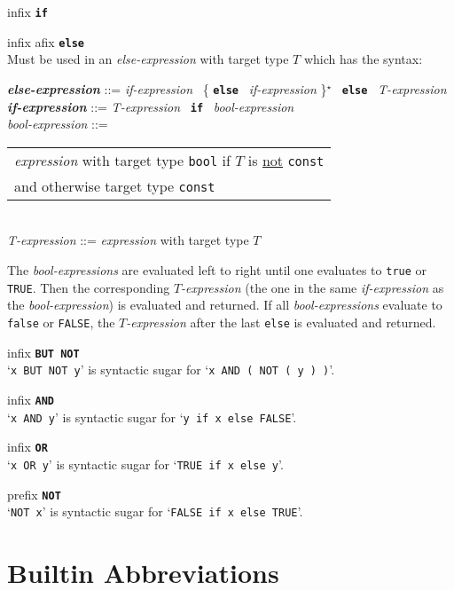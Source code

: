 \documentclass[12pt]{article}
\newcommand{\TT}[1]{{\tt \bfseries #1}}
\newcommand{\STAR}{{\Large $^\star$}}
\newcommand{\ttkey}[1]{{\tt \bfseries #1}}
\newcommand{\emkey}[1]{{\em \bfseries #1}}
\newenvironment{indpar}[1][0.3in]%
	{\begin{list}{}%
		     {\setlength{\itemsep}{0in}%
		      \setlength{\topsep}{0in}%
		      \setlength{\parsep}{1ex}%
		      \setlength{\labelwidth}{#1}%
		      \setlength{\leftmargin}{#1}%
		      \addtolength{\leftmargin}{\labelsep}}%
	 \item}%
	{\end{list}}
\newenvironment{itemlist}[1][1.2in]%
	{\begin{list}{}{\setlength{\labelwidth}{#1}%
		        \setlength{\leftmargin}{\labelwidth}%
		        \addtolength{\leftmargin}{+0.2in}%
		        \renewcommand{\makelabel}[1]{##1\hfill}}}%
	{\end{list}}
\begin{document}
\begin{itemlist}[0.2in]
\item[infix \TT{if}]
\item[infix afix \TT{else}] \vspace*{-0.15in} ~\\
Must be used in an {\em else-expression} with target
type $T$ which has the syntax:
\begin{indpar}[0.2in]
\emkey{else-expression} ::=
    {\em if-expression}~ \{ \ttkey{else}~ {\em if-expression} \}\STAR{}~
    \ttkey{else}~ {\em T-expression}
\\[0.5ex]
\emkey{if-expression} ::=
    {\em T-expression}~ \ttkey{if}~ {\em bool-expression}
\\[0.5ex]
{\em bool-expression} ::=
    \begin{tabular}[t]{@{}l@{}}
    {\em expression} with target type {\tt bool}
	if $T$ is \underline{not} {\tt const} \\
    and otherwise target type {\tt const}
    \end{tabular}
\\[0.5ex]
{\em T-expression} ::= {\em expression} with target type $T$
\end{indpar}
The {\em bool-expressions} are evaluated left to right until one
evaluates to {\tt true} or {\tt TRUE}.
Then the corresponding {\em $T$-expression}
(the one in the same {\em if-expression} as the {\em bool-expression})
is evaluated and returned.  If all {\em bool-expressions} evaluate to
{\tt false} or {\tt FALSE}, the {\em $T$-expression} after the last {\tt else}
is evaluated and returned.

\item[infix \TT{BUT NOT}] ~\\
`{\tt x BUT NOT y}' is syntactic sugar for `{\tt x AND ( NOT ( y ) )}'.

\item[infix \TT{AND}] ~\\
`{\tt x AND y}' is syntactic sugar for `{\tt y if x else FALSE}'.

\item[infix \TT{OR}] ~\\
`{\tt x OR y}' is syntactic sugar for `{\tt TRUE if x else y}'.

\item[prefix \TT{NOT}] ~\\
`{\tt NOT x}' is syntactic sugar for `{\tt FALSE if x else TRUE}'.

\end{itemlist}

\section{Builtin Abbreviations}
\end{document}
